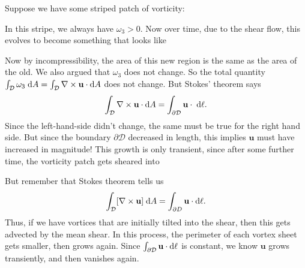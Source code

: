 \documentclass[a4paper]{article}
\begin{document}
Suppose we have some striped patch of vorticity:
\begin{center}
\end{center}
In this stripe, we always have $\omega_3 > 0$. Now over time, due to the shear flow, this evolves to become something that looks like
\begin{center}
\end{center}
Now by incompressibility, the area of this new region is the same as the area of the old. We also argued that $\omega_3$ does not change. So the total quantity $\int_\mathcal{D} \omega_3 \;\mathrm{d} A = \int_\mathcal{D} \nabla \times \mathbf{u} \cdot \mathrm{d} A$ does not change. But Stokes' theorem says
\[
  \int_{\mathcal{D}} \nabla \times \mathbf{u} \cdot \mathrm{d} A = \int_{\partial \mathcal{D}} \mathbf{u} \cdot \;\mathrm{d} \ell.
\]
Since the left-hand-side didn't change, the same must be true for the right hand side. But since the boundary $\partial \mathcal{D}$ decreased in length, this implies $\mathbf{u}$ must have increased in magnitude! This growth is only transient, since after some further time, the vorticity patch gets sheared into
\begin{center}
\end{center}
But remember that Stokes theorem tells us
\[
  \int_\mathcal{D} [\nabla \times \mathbf{u}] \;\mathrm{d} A = \int_{\partial D} \mathbf{u} \cdot \mathrm{d} \ell.
\]
Thus, if we have vortices that are initially tilted into the shear, then this gets advected by the mean shear. In this process, the perimeter of each vortex sheet gets smaller, then grows again. Since $\int_{\partial \mathcal{D}} \mathbf{u} \cdot \mathrm{d} \ell$ is constant, we know $\mathbf{u}$ grows transiently, and then vanishes again.
\end{document}

